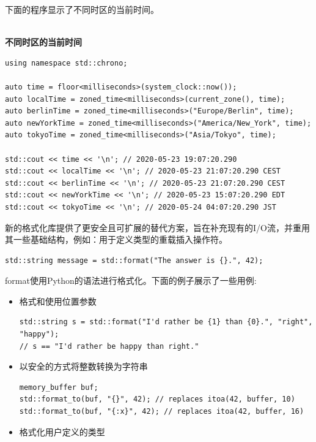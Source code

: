 下面的程序显示了不同时区的当前时间。

\hspace*{\fill} \\ %
\noindent
\textbf{不同时区的当前时间}
\begin{lstlisting}[style=styleCXX]
using namespace std::chrono;

auto time = floor<milliseconds>(system_clock::now());
auto localTime = zoned_time<milliseconds>(current_zone(), time);
auto berlinTime = zoned_time<milliseconds>("Europe/Berlin", time);
auto newYorkTime = zoned_time<milliseconds>("America/New_York", time);
auto tokyoTime = zoned_time<milliseconds>("Asia/Tokyo", time);

std::cout << time << '\n'; // 2020-05-23 19:07:20.290
std::cout << localTime << '\n'; // 2020-05-23 21:07:20.290 CEST
std::cout << berlinTime << '\n'; // 2020-05-23 21:07:20.290 CEST
std::cout << newYorkTime << '\n'; // 2020-05-23 15:07:20.290 EDT
std::cout << tokyoTime << '\n'; // 2020-05-24 04:07:20.290 JST
\end{lstlisting}


新的格式化库提供了更安全且可扩展的替代方案，旨在补充现有的I/O流，并重用其一些基础结构，例如：用于定义类型的重载插入操作符。

\begin{lstlisting}[style=styleCXX]
std::string message = std::format("The answer is {}.", 42);
\end{lstlisting}

format使用Python的语法进行格式化。下面的例子展示了一些用例:

\begin{itemize}
\item 
格式和使用位置参数

\begin{lstlisting}[style=styleCXX]
std::string s = std::format("I'd rather be {1} than {0}.", "right", "happy");
// s == "I'd rather be happy than right."
\end{lstlisting}

\item 
以安全的方式将整数转换为字符串

\begin{lstlisting}[style=styleCXX]
memory_buffer buf;
std::format_to(buf, "{}", 42); // replaces itoa(42, buffer, 10)
std::format_to(buf, "{:x}", 42); // replaces itoa(42, buffer, 16)
\end{lstlisting}

\item 
格式化用户定义的类型

\end{itemize}

